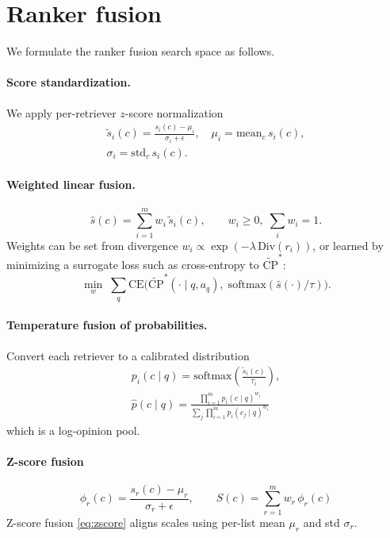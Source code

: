 \documentclass{article}
\theoremstyle{plain}
\theoremstyle{definition}
\theoremstyle{remark}
\begin{document}
\section{Ranker fusion}
\label{appendix:ranker fusion}

We formulate the ranker fusion search space as follows.

\paragraph{Score standardization.}
We apply per-retriever $z$-score normalization
\begin{multline}
\tilde{s}_i(c)=\frac{s_i(c)-\mu_i}{\sigma_i+\epsilon},\quad
\mu_i=\mathrm{mean}_c\,s_i(c),\\ \sigma_i=\mathrm{std}_c\,s_i(c).
\end{multline}

\paragraph{Weighted linear fusion.}
\begin{equation}
\hat{s}(c)=\sum_{i=1}^m w_i\,\tilde{s}_i(c),
\qquad
w_i\ge 0,\;\sum_i w_i=1.
\end{equation}
Weights can be set from divergence $w_i\propto \exp(-\lambda\,\mathrm{Div}(r_i))$, or learned by minimizing a surrogate loss such as cross-entropy to $\widetilde{\mathrm{CP}}^\ast$:
\begin{equation}
\min_{w}\; \sum_{q}\mathrm{CE}\!\Big(\widetilde{\mathrm{CP}}^\ast(\cdot\mid q,a_q),\;\mathrm{softmax}(\hat{s}(\cdot)/\tau)\Big).
\end{equation}

\paragraph{Temperature fusion of probabilities.}
Convert each retriever to a calibrated distribution
\begin{multline}
p_i(c\mid q)=\mathrm{softmax}\!\left(\frac{\tilde{s}_i(c)}{\tau_i}\right),
\\
\hat{p}(c\mid q)=\frac{\prod_{i=1}^m p_i(c\mid q)^{w_i}}{\sum_j \prod_{i=1}^m p_i(c_j\mid q)^{w_i}}
\end{multline}
which is a log-opinion pool.



\paragraph{Z-score fusion}
\begin{equation}
\phi_r(c)=\frac{s_r(c)-\mu_r}{\sigma_r+\epsilon},\qquad S(c)=\sum_{r=1}^m w_r\,\phi_r(c)
\label{eq:zscore}
\end{equation}
Z-score fusion \eqref{eq:zscore} aligns scales using per-list mean \(\mu_r\) and std \(\sigma_r\).
\end{document}
